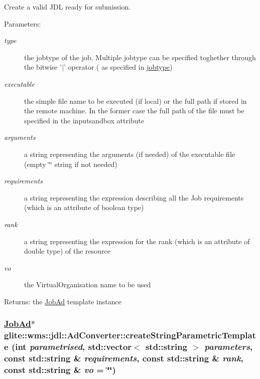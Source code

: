 Create a valid JDL ready for submission. \begin{Desc}
\item[Parameters:]
\begin{description}
\item[{\em type}]the jobtype of the job. Multiple jobtype can be specified toghether through the bitwise '$|$' operator ( as specified in \hyperlink{classglite_1_1wms_1_1jdl_1_1AdConverter_w9}{jobtype}) \item[{\em executable}]the simple file name to be executed (if local) or the full path if stored in the remote machine. In the former case the full path of the file must be specified in the inputsandbox attribute \item[{\em arguments}]a string representing the arguments (if needed) of the executable file (empty \char`\"{}\char`\"{} string if not needed) \item[{\em requirements}]a string representing the expression describing all the Job requirements (which is an attribute of boolean type) \item[{\em rank}]a string representing the expression for the rank (which is an attribute of double type) of the resource \item[{\em vo}]the Virtual\-Organisation name to be used \end{description}
\end{Desc}
\begin{Desc}
\item[Returns:]the \hyperlink{classglite_1_1wms_1_1jdl_1_1JobAd}{Job\-Ad} template instance\end{Desc}
\hypertarget{classglite_1_1wms_1_1jdl_1_1AdConverter_z21_2}{
\subsubsection[createStringParametricTemplate]{\setlength{\rightskip}{0pt plus 5cm}\hyperlink{classglite_1_1wms_1_1jdl_1_1JobAd}{Job\-Ad}$\ast$ glite::wms::jdl::Ad\-Converter::create\-String\-Parametric\-Template (int {\em parametrised}, std::vector$<$ std::string $>$ {\em parameters}, const std::string \& {\em requirements}, const std::string \& {\em rank}, const std::string \& {\em vo} = \char`\"{}\char`\"{})}}
\label{classglite_1_1wms_1_1jdl_1_1AdConverter_z21_2}


